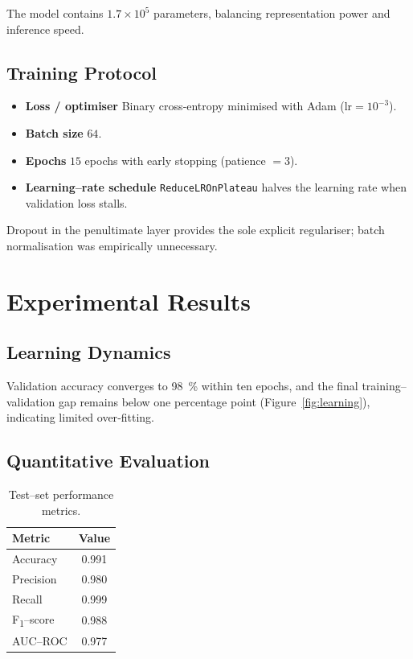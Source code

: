 \documentclass[11pt,a4paper]{article}
\begin{document}
The model contains $1.7 \times 10^{5}$ parameters, balancing representation power and inference speed.

\subsection{Training Protocol}

\begin{itemize}
  \item \textbf{Loss / optimiser}  Binary cross‐entropy minimised with Adam ($\mathrm{lr}=10^{-3}$).
  \item \textbf{Batch size}  $64$.
  \item \textbf{Epochs}  $15$ epochs with early stopping (patience $=3$).
  \item \textbf{Learning–rate schedule}  \texttt{ReduceLROnPlateau} halves the learning rate when validation loss stalls.
\end{itemize}

Dropout in the penultimate layer provides the sole explicit regulariser; batch normalisation was empirically unnecessary.

\section{Experimental Results}\label{sec:results}

\subsection{Learning Dynamics}

Validation accuracy converges to \SI{98}{\percent} within ten epochs, and the final training–validation gap remains below one percentage point (Figure~\ref{fig:learning}), indicating limited over‐fitting.

\subsection{Quantitative Evaluation}

\begin{table}[h]
  \centering
  \caption{Test–set performance metrics.}
  \label{tab:metrics}
  \begin{tabular}{lc}
    \toprule
    \textbf{Metric} & \textbf{Value} \\
    \midrule
    Accuracy  & 0.991 \\
    Precision & 0.980 \\
    Recall    & 0.999 \\
    F\textsubscript{1}–score & 0.988 \\
    AUC–ROC   & 0.977 \\
    \bottomrule
  \end{tabular}
\end{table}
\end{document}
